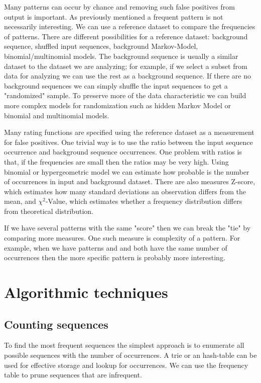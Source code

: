 Many patterns can occur by chance and removing such false positives from output is important. As previously mentioned a frequent pattern is not necessarily interesting. We can use a reference dataset to compare the frequencies of patterns. There are different possibilities for a reference dataset: background sequence, shuffled input sequences, background Markov-Model, binomial/multinomial models. The background sequence is usually a similar dataset to the dataset we are analyzing; for example, if we select a subset from data for analyzing we can use the rest as a background sequence. If there are no background sequences we can simply shuffle the input sequences to get a "randomized" sample. To preserve more of the data characteristic we can build more complex models for randomization such as hidden Markov Model\cite{RatingMarkovModel} or binomial and multinomial models.

Many rating functions are specified using the reference dataset as a measurement for false positives. One trivial way is to use the ratio between the input sequence occurrence and background sequence occurrences. One problem with ratios is that, if the frequencies are small then the ratios may be very high. Using binomial or hypergeometric model we can estimate how probable is the number of occurrences in input and background dataset. There are also measures Z-score, which estimates how many standard deviations an observation differs from the mean, and $\chi^2$-Value, which estimates whether a frequency distribution differs from theoretical distribution.

If we have several patterns with the same "score" then we can break the "tie" by comparing more measures. One such measure is complexity of a pattern. For example, when we have patterns  and  and both have the same number of occurrences then the more specific pattern is probably more interesting.

\section{Algorithmic techniques}

\WIP

\subsection{Counting sequences}

To find the most frequent sequences the simplest approach is to enumerate all possible sequences with the number of occurrences. A trie or an hash-table can be used for effective storage and lookup for occurrences. We can use the frequency table to prune sequences that are infrequent.







